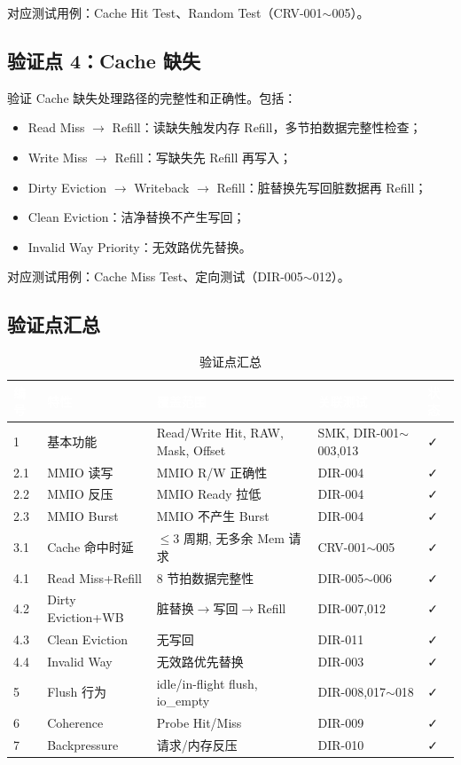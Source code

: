 \documentclass[12pt,a4paper]{ctexart}
\newcommand{\thcell}[1]{\textcolor{white}{\bfseries #1}}
\begin{document}
对应测试用例：Cache Hit Test、Random Test（CRV-001$\sim$005）。

\subsection{验证点 4：Cache 缺失}

验证 Cache 缺失处理路径的完整性和正确性。包括：
\begin{itemize}[leftmargin=*]
  \item Read Miss $\rightarrow$ Refill：读缺失触发内存 Refill，多节拍数据完整性检查；
  \item Write Miss $\rightarrow$ Refill：写缺失先 Refill 再写入；
  \item Dirty Eviction $\rightarrow$ Writeback $\rightarrow$ Refill：脏替换先写回脏数据再 Refill；
  \item Clean Eviction：洁净替换不产生写回；
  \item Invalid Way Priority：无效路优先替换。
\end{itemize}

对应测试用例：Cache Miss Test、定向测试（DIR-005$\sim$012）。

\subsection{验证点汇总}

\begin{table}[H]
\centering
\caption{验证点汇总}
\small
\renewcommand{\arraystretch}{1.2}
\begin{tabular}{@{}p{1cm}p{2.8cm}p{4cm}p{3cm}p{0.8cm}@{}}
\toprule
\rowcolor{primaryblue}
\thcell{编号} & \thcell{特性} & \thcell{覆盖范围} & \thcell{关联测试} & \thcell{状态} \\
\midrule
\rowcolor{rowgray} 1 & 基本功能 & Read/Write Hit, RAW, Mask, Offset & SMK, DIR-001$\sim$003,013 & ✓ \\
2.1 & MMIO 读写 & MMIO R/W 正确性 & DIR-004 & ✓ \\
\rowcolor{rowgray} 2.2 & MMIO 反压 & MMIO Ready 拉低 & DIR-004 & ✓ \\
2.3 & MMIO Burst & MMIO 不产生 Burst & DIR-004 & ✓ \\
\rowcolor{rowgray} 3.1 & Cache 命中时延 & $\le$3 周期, 无多余 Mem 请求 & CRV-001$\sim$005 & ✓ \\
4.1 & Read Miss+Refill & 8 节拍数据完整性 & DIR-005$\sim$006 & ✓ \\
\rowcolor{rowgray} 4.2 & Dirty Eviction+WB & 脏替换$\rightarrow$写回$\rightarrow$Refill & DIR-007,012 & ✓ \\
4.3 & Clean Eviction & 无写回 & DIR-011 & ✓ \\
\rowcolor{rowgray} 4.4 & Invalid Way & 无效路优先替换 & DIR-003 & ✓ \\
5 & Flush 行为 & idle/in-flight flush, io\_empty & DIR-008,017$\sim$018 & ✓ \\
\rowcolor{rowgray} 6 & Coherence & Probe Hit/Miss & DIR-009 & ✓ \\
7 & Backpressure & 请求/内存反压 & DIR-010 & ✓ \\
\bottomrule
\end{tabular}
\end{table}
\end{document}

